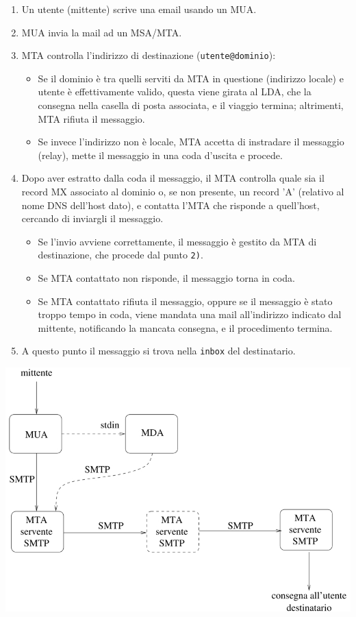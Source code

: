 \documentclass[a4paper]{report}
\begin{document}
\begin{enumerate}
\item Un utente (mittente) scrive una email usando un MUA.
\item MUA invia la mail ad un MSA/MTA.
\item MTA controlla l'indirizzo di destinazione (\texttt{utente@dominio}):
	\begin{itemize}
	\item Se il dominio è tra quelli serviti da MTA in questione (indirizzo locale) e utente è effettivamente valido, questa viene girata al LDA, che la consegna nella casella di posta associata, e il viaggio termina; altrimenti, MTA rifiuta il messaggio.
	\item Se invece l'indirizzo non è locale, MTA accetta di instradare il messaggio (relay), mette il messaggio in una coda d'uscita e procede.
	\end{itemize}
\item Dopo aver estratto dalla coda il messaggio, il MTA controlla quale sia il record MX associato al dominio o, se non presente, un record 'A' (relativo al nome DNS dell'host dato), e contatta l'MTA che risponde a quell'host, cercando di inviargli il messaggio.
	\begin{itemize}
	\item Se l'invio avviene correttamente, il messaggio è gestito da MTA di destinazione, che procede dal punto \texttt{2)}.
	\item Se MTA contattato non risponde, il messaggio torna in coda.
	\item Se MTA contattato rifiuta il messaggio, oppure se il messaggio è stato troppo tempo in coda, viene mandata una mail all'indirizzo indicato dal mittente, notificando la mancata consegna, e il procedimento termina.
	\end{itemize}
\item A questo punto il messaggio si trova nella \texttt{inbox} del destinatario.
\end{enumerate}
\begin{center}
\includegraphics[scale=0.5]{flussoposta.png}
\end{center}
\end{document}
